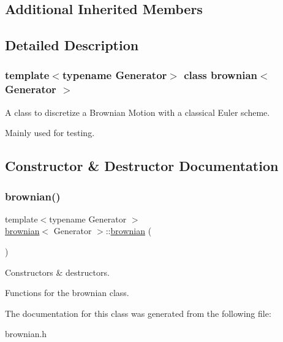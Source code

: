 \subsection*{Additional Inherited Members}


\subsection{Detailed Description}
\subsubsection*{template$<$typename Generator$>$\newline
class brownian$<$ Generator $>$}

A class to discretize a Brownian Motion with a classical Euler scheme. 

Mainly used for testing. 

\subsection{Constructor \& Destructor Documentation}
\mbox{\label{classbrownian_ab606472ba893b778b1ad3f57553354e3}} 
\subsubsection{\texorpdfstring{brownian()}{brownian()}}
{\footnotesize\ttfamily template$<$typename Generator $>$ \\
\mbox{\hyperlink{classbrownian}{brownian}}$<$ Generator $>$\+::\mbox{\hyperlink{classbrownian}{brownian}} (\begin{DoxyParamCaption}{ }\end{DoxyParamCaption})}



Constructors \& destructors. 

Functions for the brownian class. 

The documentation for this class was generated from the following file\+:\begin{DoxyCompactItemize}
\item 
brownian.\+h\end{DoxyCompactItemize}
